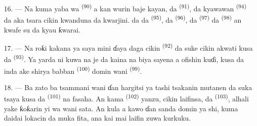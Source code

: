 16. --- Na kuma yaba wa  \textsuperscript{(90)} a kan
wurin baje kayan, da  \textsuperscript{(91)}, da
kyawawan  \textsuperscript{(94)} da aka tsara cikin
kwanduna da kwarjini.  da 
da  \textsuperscript{(95)}, da 
\textsuperscript{(96)}, da  \textsuperscript{(97)} da
 \textsuperscript{(98)} an kwafe su da kyau ƙwarai.

\VUsaut{4.4mm}
\VUsaut{2.8mm}

17. --- Na roƙi kakana ya saya mini ɗaya daga cikin  \textsuperscript{(92)} da suke cikin akwati kusa da  \textsuperscript{(93)}. Ya yarda ni kuwa na je da kaina na biya
sayena a ofishin kuɗi, kusa da inda ake shirya babban 
\textsuperscript{(100)} domin wani 
\textsuperscript{(99)}.

18. --- Ba zato ba tsammani wani ɗan hargitsi ya tashi tsakanin
mutanen da suka tsaya kusa da 
\textsuperscript{(101)} na fasaha. An kama 
\textsuperscript{(102)} yanzu, cikin laifinsa, da 
\textsuperscript{(103)}, alhali yake ƙoƙarin yi wa wani sata. An kula a kawo
ɗan sanda domin ya  shi, kuma daidai lokacin da muka fita,
ana kai mai laifin zuwa kurkuku.

\VUsaut{6.0mm}
\VUfilet{22mm}
